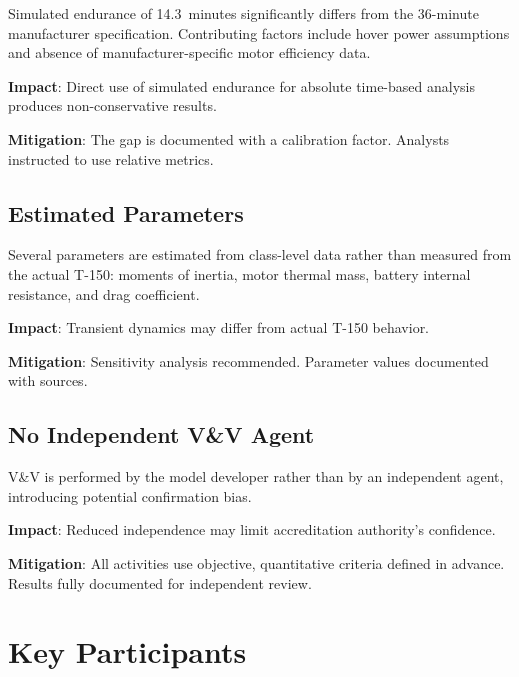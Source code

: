 \documentclass[11pt, letterpaper]{article}
\begin{document}
\unclass Simulated endurance of 14.3~minutes significantly differs from the 36-minute manufacturer specification. Contributing factors include hover power assumptions and absence of manufacturer-specific motor efficiency data.

\unclass \textbf{Impact}: Direct use of simulated endurance for absolute time-based analysis produces non-conservative results.

\unclass \textbf{Mitigation}: The gap is documented with a calibration factor. Analysts instructed to use relative metrics.

\subsection{\unclass Estimated Parameters}

\unclass Several parameters are estimated from class-level data rather than measured from the actual T-150: moments of inertia, motor thermal mass, battery internal resistance, and drag coefficient.

\unclass \textbf{Impact}: Transient dynamics may differ from actual T-150 behavior.

\unclass \textbf{Mitigation}: Sensitivity analysis recommended. Parameter values documented with sources.

\subsection{\unclass No Independent V\&V Agent}

\unclass V\&V is performed by the model developer rather than by an independent agent, introducing potential confirmation bias.

\unclass \textbf{Impact}: Reduced independence may limit accreditation authority's confidence.

\unclass \textbf{Mitigation}: All activities use objective, quantitative criteria defined in advance. Results fully documented for independent review.

\pagebreak


\section{\unclass Key Participants}
\end{document}
